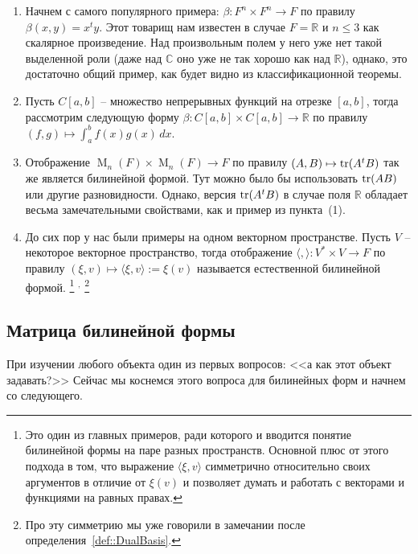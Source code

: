 \begin{enumerate}
\item Начнем с самого популярного примера: $\beta\colon F^n\times F^n \to F$ по правилу $\beta(x,y) = x^t y$.
Этот товарищ нам известен в случае $F = \mathbb R$ и $n\leqslant 3$ как скалярное произведение.
Над произвольным полем у него уже нет такой выделенной роли (даже над $\mathbb C$ оно уже не так хорошо как над $\mathbb R$), однако, это достаточно общий пример, как будет видно из классификационной теоремы.

\item Пусть $C[a,b]$ -- множество непрерывных функций на отрезке $[a,b]$, тогда рассмотрим следующую форму $\beta\colon C[a,b]\times C[a,b]\to \mathbb R$ по правилу $(f,g)\mapsto \int_a^b f(x)g(x)\,dx$.

\item Отображение $\operatorname{M}_n(F)\times \operatorname{M}_n(F)\to F$ по правилу $(A,B)\mapsto \operatorname{tr}(A^tB)$ так же является билинейной формой.
Тут можно было бы использовать $\operatorname{tr}(AB)$ или другие разновидности.
Однако, версия $\operatorname{tr}(A^tB)$ в случае поля $\mathbb R$ обладает весьма замечательными свойствами, как и пример из пункта~(1).

\item До сих пор у нас были примеры на одном векторном пространстве.
Пусть $V$ -- некоторое векторное пространство, тогда отображение $\langle,\rangle\colon V^*\times V\to F$ по правилу $(\xi,v)\mapsto \langle\xi,v\rangle := \xi(v)$ называется естественной билинейной формой.%
\footnote{Это один из главных примеров, ради которого и вводится понятие билинейной формы на паре разных пространств.
Основной плюс от этого подхода в том, что выражение $\langle \xi,v\rangle$ симметрично относительно своих аргументов в отличие от $\xi(v)$ и позволяет думать и работать с векторами и функциями на равных правах.}%
${}^{,}$%
\footnote{Про эту симметрию мы уже говорили в замечании после определения~\ref{def::DualBasis}.}
\end{enumerate}

\subsection{Матрица билинейной формы}

При изучении любого объекта один из первых вопросов: <<а как этот объект задавать?>> Сейчас мы коснемся этого вопроса для билинейных форм и начнем со следующего.

